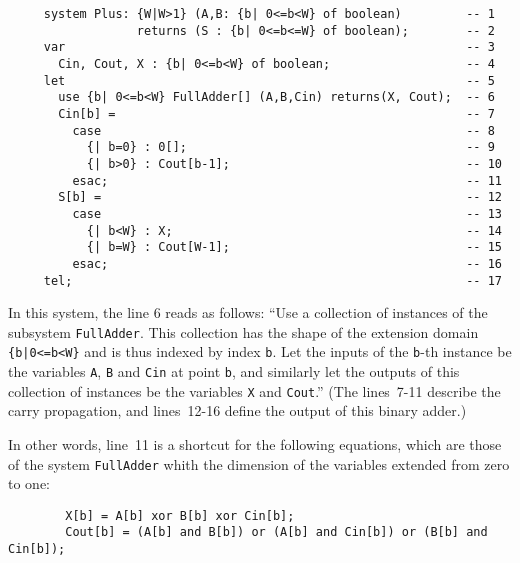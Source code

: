 \begin{verbatim}
     system Plus: {W|W>1} (A,B: {b| 0<=b<W} of boolean)         -- 1  
                  returns (S : {b| 0<=b<=W} of boolean);        -- 2  
     var                                                        -- 3  
       Cin, Cout, X : {b| 0<=b<W} of boolean;                   -- 4  
     let                                                        -- 5  
       use {b| 0<=b<W} FullAdder[] (A,B,Cin) returns(X, Cout);  -- 6  
       Cin[b] =                                                 -- 7  
         case                                                   -- 8  
           {| b=0} : 0[];                                       -- 9  
           {| b>0} : Cout[b-1];                                 -- 10 
         esac;                                                  -- 11 
       S[b] =                                                   -- 12 
         case                                                   -- 13 
           {| b<W} : X;                                         -- 14 
           {| b=W} : Cout[W-1];                                 -- 15 
         esac;                                                  -- 16 
     tel;                                                       -- 17 
\end{verbatim}


In this system, the line 6 reads as follows: ``Use a collection of
instances of the subsystem \texttt{FullAdder}. This collection has the
shape of the extension domain \verb!{b|0<=b<W}! 
and is thus indexed by index \texttt{b}. Let the inputs of
the \texttt{b}-th instance be the variables \texttt{A}, \texttt{B} and
\texttt{Cin} at point
\texttt{b}, and similarly let the outputs of this collection of
instances be the variables \texttt{X} and \texttt{Cout}.''
(The lines~7-11 describe the carry propagation, and lines~12-16
define the output of this binary adder.)

In other words, line~11 is a shortcut for the following equations,
which are those of the system \texttt{FullAdder} whith the dimension
of the variables extended from zero to one:

\begin{verbatim}
        X[b] = A[b] xor B[b] xor Cin[b];
        Cout[b] = (A[b] and B[b]) or (A[b] and Cin[b]) or (B[b] and Cin[b]);
\end{verbatim}






